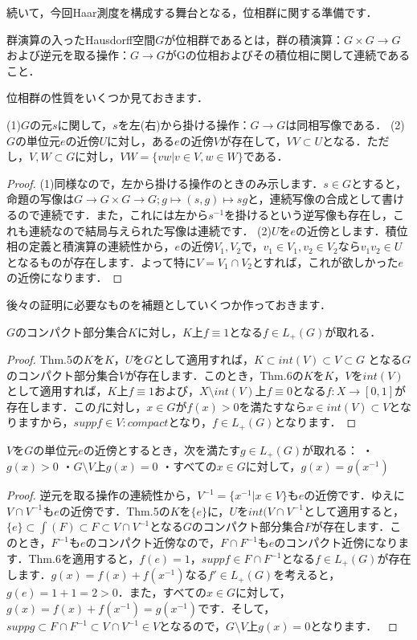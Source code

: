 続いて，今回Haar測度を構成する舞台となる，位相群に関する準備です．

\begin{defi}[位相群]
群演算の入ったHausdorff空間$G$が位相群であるとは，群の積演算：$G \times G \to G$および逆元を取る操作：$G \to G$がGの位相およびその積位相に関して連続であること．
\end{defi}
位相群の性質をいくつか見ておきます．
\begin{prop}[位相群の性質]
(1)$G$の元$s$に関して，$s$を左(右)から掛ける操作：$G \to G$は同相写像である．
(2)$G$の単位元$e$の近傍$U$に対し，ある$e$の近傍$V$が存在して，$VV \subset U$となる．ただし，$V,W \subset G$に対し，$VW= \{ vw | v \in V, w \in W \}$である．
\end{prop}
\begin{proof}
(1)同様なので，左から掛ける操作のときのみ示します．$s \in G$とすると，命題の写像は$G \to G \times G \to G ; g \mapsto (s,g) \mapsto sg$と，連続写像の合成として書けるので連続です．また，これには左から$s^{-1}$を掛けるという逆写像も存在し，これも連続なので結局与えられた写像は連続です．
(2)$U$を$e$の近傍とします．積位相の定義と積演算の連続性から，$e$の近傍$V_1, V_2$で，$v_{1} \in V_1, v_{2} \in V_2$なら$v_{1}v_{2} \in U$となるものが存在します．よって特に$V=V_1 \cap V_2$とすれば，これが欲しかった$e$の近傍になります．
\end{proof}
後々の証明に必要なものを補題としていくつか作っておきます．

\begin{lem}
$G$のコンパクト部分集合$K$に対し，$K$上$f \equiv 1$となる$f \in L_{+}(G)$が取れる．
\end{lem}
\begin{proof}
Thm.5の$K$を$K$，$U$を$G$として適用すれば，$K \subset int(V) \subset V \subset G$ となる$G$のコンパクト部分集合$V$が存在します．このとき，Thm.6の$K$を$K$，$V$を$int(V)$として適用すれば，$K$上$f \equiv 1$および，$X \setminus int(V)$上$f \equiv 0$となる$f \colon X \to [0, 1]$が存在します．この$f$に対し，$x \in G$が$f(x)>0$を満たすなら$x \in int(V) \subset V$となりますから，$supp f \in V \colon compact$となり，$f \in L_{+}(G)$となります．
\end{proof}
\begin{lem}
$V$を$G$の単位元$e$の近傍とするとき，次を満たす$g \in L_{+}(G)$が取れる：
・$g(x)>0$
・$G \setminus V$上$g(x)=0$
・すべての$x \in G$に対して，$g(x)=g(x^{-1})$
\end{lem}
\begin{proof}
逆元を取る操作の連続性から，$V^{-1}=\{ x^{-1} | x \in V \}$も$e$の近傍です．ゆえに$V \cap V^{-1}$も$e$の近傍です．Thm.5の$K$を$\{e\}$に，$U$を$int(V \cap V^{-1}$として適用すると，$\{e\} \subset \int(F) \subset F \subset V \cap V^{-1}$となる$G$のコンパクト部分集合$F$が存在します．このとき，$F^{-1}$も$e$のコンパクト近傍なので，$F \cap F^{-1}$も$e$のコンパクト近傍になります．Thm.6を適用すると，$f(e)=1$，$supp f \in F \cap F^{-1}$となる$f \in L_{+}(G)$が存在します．$g(x)=f(x)+f(x^{-1})$なる$f' \in L_{+}(G)$を考えると，$g(e)=1+1=2>0$．また，すべての$x \in G$に対して，$g(x)=f(x)+f(x^{-1})=g(x^{-1})$です．そして，$supp g \subset F \cap F^{-1} \subset V \cap V^{-1} \in V$となるので，$G \setminus V$上$g(x)=0$となります．　
\end{proof}

